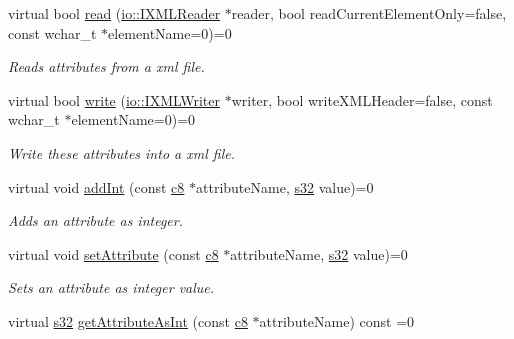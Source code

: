 \begin{DoxyCompactItemize}
virtual bool \hyperlink{classirr_1_1io_1_1IAttributes_a9001fd2760cba4e1b13efc6539c0f441}{read} (\hyperlink{namespaceirr_1_1io_ab620b13630f0818f3eefc000f6917fe4}{io\+::\+I\+X\+M\+L\+Reader} $\ast$reader, bool read\+Current\+Element\+Only=false, const wchar\+\_\+t $\ast$element\+Name=0)=0
\begin{DoxyCompactList}\small\item\em Reads attributes from a xml file. \end{DoxyCompactList}\item 
virtual bool \hyperlink{classirr_1_1io_1_1IAttributes_a5a32fcdfca5426cccf69e8f654a0050c}{write} (\hyperlink{classirr_1_1io_1_1IXMLWriter}{io\+::\+I\+X\+M\+L\+Writer} $\ast$writer, bool write\+X\+M\+L\+Header=false, const wchar\+\_\+t $\ast$element\+Name=0)=0
\begin{DoxyCompactList}\small\item\em Write these attributes into a xml file. \end{DoxyCompactList}\item 
\mbox{\label{classirr_1_1io_1_1IAttributes_afbde111f36d59e9cf42b20595cf2ed24}} 
virtual void \hyperlink{classirr_1_1io_1_1IAttributes_afbde111f36d59e9cf42b20595cf2ed24}{add\+Int} (const \hyperlink{namespaceirr_a9395eaea339bcb546b319e9c96bf7410}{c8} $\ast$attribute\+Name, \hyperlink{namespaceirr_ac66849b7a6ed16e30ebede579f9b47c6}{s32} value)=0
\begin{DoxyCompactList}\small\item\em Adds an attribute as integer. \end{DoxyCompactList}\item 
\mbox{\label{classirr_1_1io_1_1IAttributes_a03fa31acb481ae23678676cc183f09a6}} 
virtual void \hyperlink{classirr_1_1io_1_1IAttributes_a03fa31acb481ae23678676cc183f09a6}{set\+Attribute} (const \hyperlink{namespaceirr_a9395eaea339bcb546b319e9c96bf7410}{c8} $\ast$attribute\+Name, \hyperlink{namespaceirr_ac66849b7a6ed16e30ebede579f9b47c6}{s32} value)=0
\begin{DoxyCompactList}\small\item\em Sets an attribute as integer value. \end{DoxyCompactList}\item 
virtual \hyperlink{namespaceirr_ac66849b7a6ed16e30ebede579f9b47c6}{s32} \hyperlink{classirr_1_1io_1_1IAttributes_ac6c51254c9d43cb58cb89866cdd210ed}{get\+Attribute\+As\+Int} (const \hyperlink{namespaceirr_a9395eaea339bcb546b319e9c96bf7410}{c8} $\ast$attribute\+Name) const =0

\end{DoxyCompactItemize}
